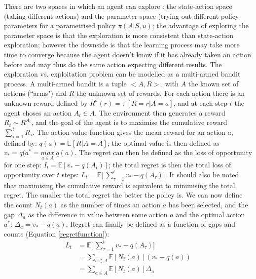 There are two spaces in which an agent can explore : the state-action space (taking different actions) and the parameter space (trying out different policy parameters for a parametrised policy $\pi(A|S,u)$; the advantage of exploring the parameter space is that the exploration is more consistent than state-action exploration; however the downside is that the learning process may take more time to converge because the agent doesn't know if it has already taken an action before and may thus do the same action expecting different results. \newline
The exploration vs. exploitation problem can be modelled as a multi-armed bandit process. A multi-armed bandit is a tuple $<A,R>$, with $A$ the known set of actions (``arms") and $R$ the unknown set of rewards. For each action there is an unknown reward defined by $R^{a}(r) = \mathbb{P}\left[R=r|A=a\right]$, and at each step $t$ the agent choses an action $A_t \in A$. The environment then generates a reward $R_t \sim R^{A_t}$, and the goal of the agent is to maximise the cumulative reward $\sum_{\tau=1}^{t}R_{\tau}$. The action-value function gives the mean reward for an action $a$, defined by: $q(a)=\mathbb{E} \left[R|A=A\right]$; the optimal value is then defined as $v_*=q(a^{*}=\underset{a \in A}{max} \: q(a)$. The regret can then be defined as the loss of opportunity for one step: $I_t = \mathbb{E} \left[ v_* - q(A_t)\right]$; the total regret is then the total loss of opportunity over $t$ steps: $L_t = \mathbb{E} \Biggl[ \: \sum\limits_{\tau=1}^{t} v_* - q(A_{\tau})\Biggr]$. It should also be noted that maximising the cumulative reward is equivalent to minimising the total regret. The smaller the total regret the better the policy is. \newline
We can now define the count $N_t(a)$ as the number of times an action $a$ has been selected, and the gap $\Delta_a$ as the difference in value between some action $a$ and the optimal action $a^{*}$: $\Delta_a = v_* - q(a)$. Regret can finally be defined as a function of gaps and counts (Equation \ref{regretfunction}): 
\begin{equation}
\label{regretfunction}
	\begin{split}
		L_t & = \mathbb{E} \Biggl[ \: \sum\limits_{\tau=1}^{t} v_* - q(A_{\tau})\Biggr] \\
		& = \sum\limits_{a \in A} \mathbb{E}\left[N_t(a)\right](v_*-q(a)) \\
		& = \sum\limits_{a \in A}\mathbb{E}\left[N_t(a)\right]\Delta_a
	\end{split}
\end{equation}

